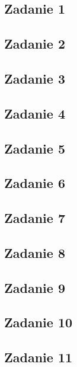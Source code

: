\subsection{Zadanie 1}


\subsection{Zadanie 2}


\subsection{Zadanie 3}


\subsection{Zadanie 4}


\subsection{Zadanie 5}


\subsection{Zadanie 6}


\subsection{Zadanie 7}


\subsection{Zadanie 8}


\subsection{Zadanie 9}


\subsection{Zadanie 10}
\label{page_fault_freq}


\subsection{Zadanie 11}
\label{printf_buffer_troll}
